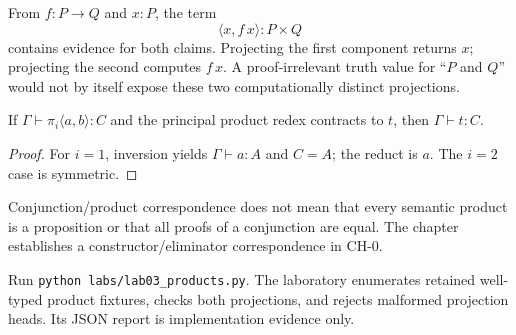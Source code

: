 

\begin{workedexample}[title={A proof object that cannot forget either side}]
From $f:P\to Q$ and $x:P$, the term
\[
\langle x,f\,x\rangle:P\times Q
\]
contains evidence for both claims. Projecting the first component returns $x$; projecting the second computes $f\,x$. A proof-irrelevant truth value for ``$P$ and $Q$'' would not by itself expose these two computationally distinct projections.
\end{workedexample}

\begin{theorem}
If $\Gamma\vdash \pi_i\langle a,b\rangle:C$ and the principal product redex contracts to $t$, then $\Gamma\vdash t:C$.
\end{theorem}
\begin{proof}
For $i=1$, inversion yields $\Gamma\vdash a:A$ and $C=A$; the reduct is $a$. The $i=2$ case is symmetric.
\end{proof}



\begin{warningbox}
Conjunction/product correspondence does not mean that every semantic product is a proposition or that all proofs of a conjunction are equal. The chapter establishes a constructor/eliminator correspondence in $\mathrm{CH}\text{-}0$.
\end{warningbox}

\begin{labbox}
Run \texttt{python labs/lab03_products.py}. The laboratory enumerates retained well-typed product fixtures, checks both projections, and rejects malformed projection heads. Its JSON report is implementation evidence only.
\end{labbox}

